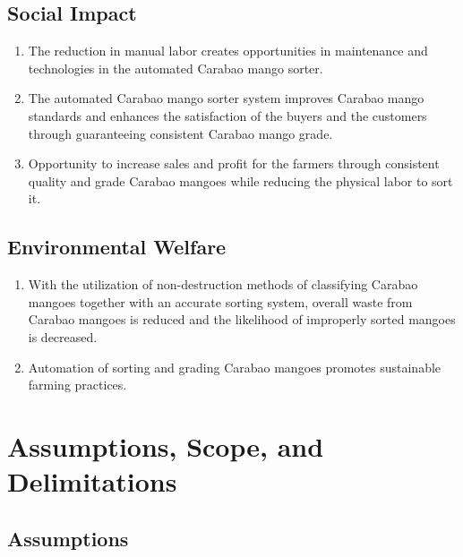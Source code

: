 \subsection{Social Impact}

\begin{enumerate}
	\item The reduction in manual labor creates opportunities in maintenance and
	 technologies in the automated \gls{Carabao mango}  sorter.
	
	\item The automated \gls{Carabao mango}  sorter system improves Carabao mango 
	standards and enhances the satisfaction of the buyers and the customers through
	 guaranteeing consistent Carabao mango grade.
	
	\item Opportunity to increase sales and profit for the farmers through consistent 
	quality and grade Carabao mangoes while reducing the physical labor to sort it.
\end{enumerate}

\subsection{Environmental Welfare}

\begin{enumerate}
	\item With the utilization of non-destruction methods of classifying Carabao mangoes together with an
	 accurate sorting system, overall waste from Carabao mangoes is reduced and the likelihood
	  of improperly sorted mangoes is decreased.
	
	\item Automation of sorting and grading Carabao mangoes promotes sustainable farming practices.
	
\end{enumerate}



\section{Assumptions, Scope, and Delimitations}

\subsection{Assumptions}

